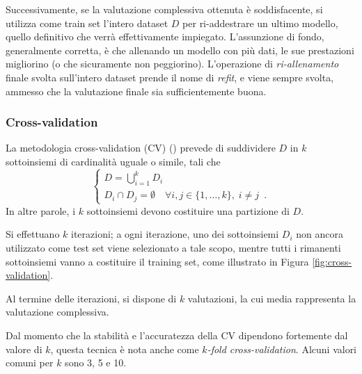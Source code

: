 Successivamente, se la valutazione complessiva ottenuta è soddisfacente, si utilizza come train set l'intero dataset $D$ per ri-addestrare un ultimo modello, quello definitivo che verrà effettivamente impiegato. L'assunzione di fondo, generalmente corretta, è che allenando un modello con più dati, le sue prestazioni migliorino (o che sicuramente non peggiorino). L'operazione di \textit{ri-allenamento} finale svolta sull'intero dataset prende il nome di \textit{refit}, e viene sempre svolta, ammesso che la valutazione finale sia sufficientemente buona.

\subsubsection{Cross-validation}
La metodologia cross-validation (CV) (\cite{stone1974cross}) prevede di suddividere $ D $ in $ k $ sottoinsiemi di cardinalità uguale o simile, tali che 
\begin{equation}
    \begin{cases}
        D = \bigcup_{i=1}^{k} D_i \\
        D_i \cap D_j = \emptyset \quad \forall i, j \in \{1, \dots, k\}, \; i \neq j \enspace .
    \end{cases}
\end{equation}
In altre parole, i $k$ sottoinsiemi devono costituire una partizione di $D$.

Si effettuano $k$ iterazioni; a ogni iterazione, uno dei sottoinsiemi $D_i$ non ancora utilizzato come test set viene selezionato a tale scopo, mentre tutti i rimanenti sottoinsiemi vanno a costituire il training set, come illustrato in Figura \ref{fig:cross-validation}.  

Al termine delle iterazioni, si dispone di $k$ valutazioni, la cui media rappresenta la valutazione complessiva.  

Dal momento che la stabilità e l'accuratezza della CV dipendono fortemente dal valore di $k$, questa tecnica è nota anche come \textit{$k$-fold cross-validation}. Alcuni valori comuni per $k$ sono 3, 5 e 10.

